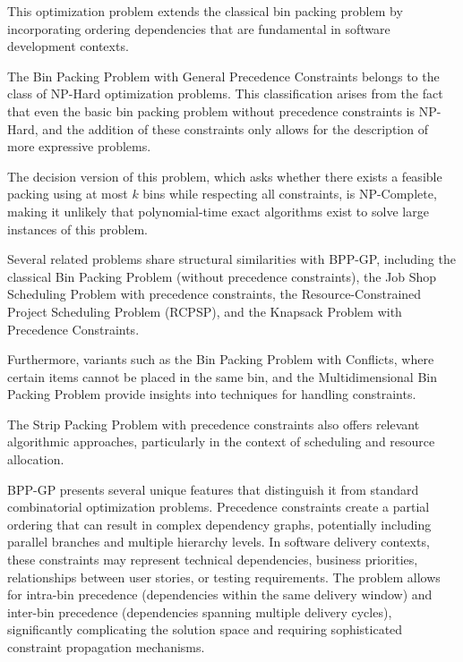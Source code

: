 \documentclass[12pt]{article}
\begin{document}
This optimization problem extends the classical bin packing problem by incorporating ordering dependencies that are fundamental in software development contexts.

The Bin Packing Problem with General Precedence Constraints belongs to the class of NP-Hard optimization problems. This classification arises from the fact that even the basic bin packing problem without precedence constraints is NP-Hard, and the addition of these constraints only allows for the description of more expressive problems.

The decision version of this problem, which asks whether there exists a feasible packing using at most $k$ bins while respecting all constraints, is NP-Complete, making it unlikely that polynomial-time exact algorithms exist to solve large instances of this problem.

Several related problems share structural similarities with BPP-GP, including the classical Bin Packing Problem (without precedence constraints), the Job Shop Scheduling Problem with precedence constraints, the Resource-Constrained Project Scheduling Problem (RCPSP), and the Knapsack Problem with Precedence Constraints.

Furthermore, variants such as the Bin Packing Problem with Conflicts, where certain items cannot be placed in the same bin, and the Multidimensional Bin Packing Problem provide insights into techniques for handling constraints.

The Strip Packing Problem with precedence constraints also offers relevant algorithmic approaches, particularly in the context of scheduling and resource allocation.

BPP-GP presents several unique features that distinguish it from standard combinatorial optimization problems. Precedence constraints create a partial ordering that can result in complex dependency graphs, potentially including parallel branches and multiple hierarchy levels. In software delivery contexts, these constraints may represent technical dependencies, business priorities, relationships between user stories, or testing requirements. The problem allows for intra-bin precedence (dependencies within the same delivery window) and inter-bin precedence (dependencies spanning multiple delivery cycles), significantly complicating the solution space and requiring sophisticated constraint propagation mechanisms.
\end{document}
